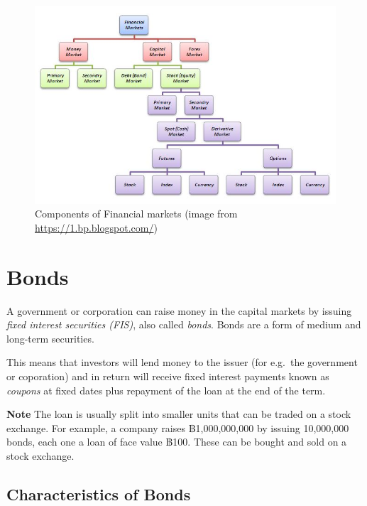 \documentclass[landscape, 20pt]{extreport}
\theoremstyle{definition}
\theoremstyle{definition}
\theoremstyle{definition}
\theoremstyle{definition}
\theoremstyle{remark}
\begin{document}
\newpage

\begin{figure}[ht!]
\centering
\includegraphics[width=2000mm]{FigFinancialSystem.jpeg}
\caption{Components of Financial markets (image from  \url{https://1.bp.blogspot.com/})}
\end{figure}


\hypertarget{bonds}{%
\section{Bonds}\label{bonds}}

A government or corporation can raise money in the capital markets by
issuing \emph{fixed interest securities (FIS)}, also called \emph{bonds}. Bonds
are a form of medium and long-term securities.

This means that investors will lend money to the issuer (for e.g.~the
government or coporation) and in return will receive fixed interest
payments known as \emph{coupons} at fixed dates plus repayment of the loan at
the end of the term.

\textbf{Note} The loan is usually split into smaller units that can be traded
on a stock exchange. For example, a company raises ฿1,000,000,000 by
issuing 10,000,000 bonds, each one a loan of face value ฿100. These can
be bought and sold on a stock exchange.

\hypertarget{characteristics-of-bonds}{%
\subsection{Characteristics of Bonds}\label{characteristics-of-bonds}}
\end{document}
